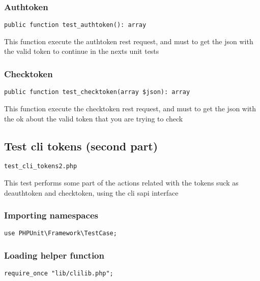 \documentclass[a4paper]{article}
\begin{document}
\hypertarget{toc35}{}
\subsubsection{Authtoken}

\begin{lstlisting}
public function test_authtoken(): array
\end{lstlisting}

This function execute the authtoken rest request, and must to get the
json with the valid token to continue in the nexts unit tests

\hypertarget{toc36}{}
\subsubsection{Checktoken}

\begin{lstlisting}
public function test_checktoken(array $json): array
\end{lstlisting}

This function execute the checktoken rest request, and must to get the
json with the ok about the valid token that you are trying to check

\hypertarget{toc37}{}
\subsection{Test cli tokens (second part)}

\begin{lstlisting}
test_cli_tokens2.php
\end{lstlisting}

This test performs some part of the actions related with the tokens suck
as deauthtoken and checktoken, using the cli sapi interface

\hypertarget{toc38}{}
\subsubsection{Importing namespaces}

\begin{lstlisting}
use PHPUnit\Framework\TestCase;
\end{lstlisting}

\hypertarget{toc39}{}
\subsubsection{Loading helper function}

\begin{lstlisting}
require_once "lib/clilib.php";
\end{lstlisting}
\end{document}
